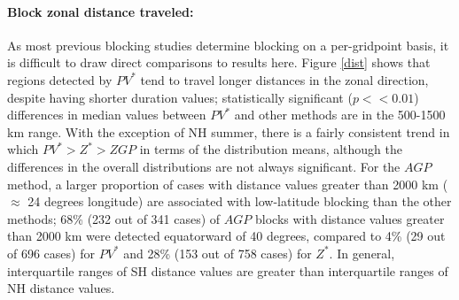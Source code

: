 \documentclass[smallextended]{svjour3}       %
\numberwithin{equation}{section}
\begin{document}


 
\paragraph{Block zonal distance traveled:} As most previous blocking studies determine blocking on a per-gridpoint basis, it is difficult to draw direct comparisons to results here. Figure \ref{dist} shows that regions detected by $PV^*$ tend to travel longer distances in the zonal direction, despite having shorter duration values; statistically significant ($p<<0.01$) differences in median values between $PV^*$ and other methods are in the 500-1500 km range. With the exception of NH summer, there is a fairly consistent trend in which $PV^*>Z^*>ZGP$ in terms of the distribution means, although the differences in the overall distributions are not always significant. For the $AGP$ method, a larger proportion of cases with distance values greater than 2000 km ($\approx$ 24 degrees longitude) are associated with low-latitude blocking than the other methods; 68\% (232 out of 341 cases) of $AGP$ blocks with distance values greater than 2000 km were detected equatorward of 40 degrees, compared to 4\% (29 out of 696 cases) for $PV^*$ and 28\% (153 out of 758 cases) for $Z^*$. In general, interquartile ranges of SH distance values are greater than interquartile ranges of NH distance values.
\end{document}
